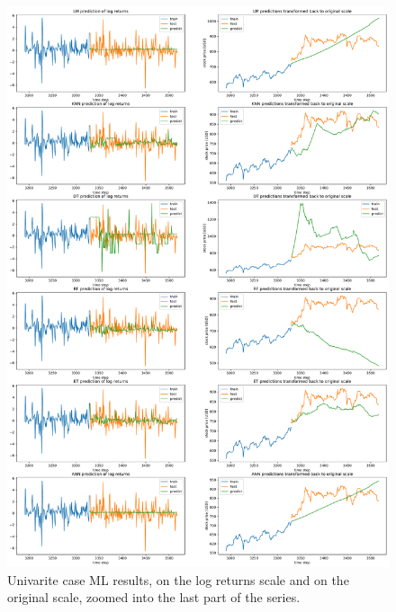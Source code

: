 \begin{figure}
	\centering
	\includegraphics[width=\textwidth]{img/img_mlresults_basic.pdf}
	\caption{Univarite case ML results, on the log returns scale and on the original scale, zoomed into the last part of the series.}
	\label{fig:mlresults_basic}
\end{figure}


